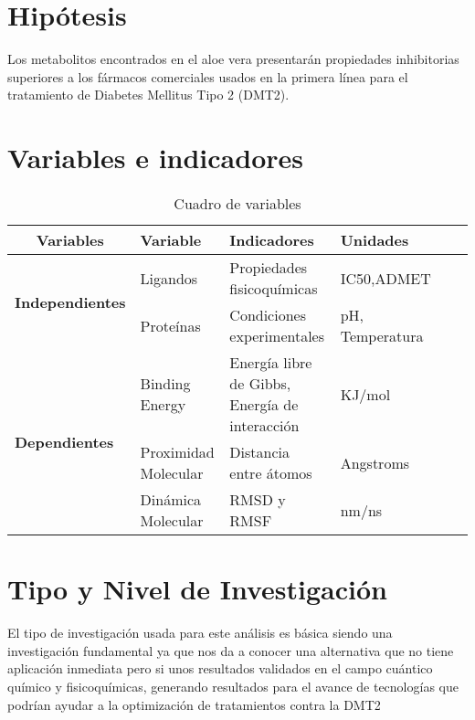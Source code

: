 \section{Hipótesis}
Los metabolitos encontrados en el aloe vera presentarán propiedades inhibitorias superiores a los fármacos comerciales usados en la primera línea para el tratamiento de Diabetes Mellitus Tipo 2 (DMT2).  


\section{Variables e indicadores}

 \begin{table}[htbp]
 \caption{Cuadro de variables}\label{t1}
  \begin{tabular}{llcp{3.5cm}p{3.5cm}p{3.5cm}cp{3.5cm}}
  \hline
  \multicolumn{3}{c}{\textbf{Variables}}                       & \textbf{Variable}      & \textbf{Indicadores}                 & \textbf{Unidades} \\ \hline
  \multicolumn{3}{c}{\multirow{2}{*}{\textbf{Independientes}}} 
  & Ligandos & Propiedades fisicoquímicas & IC50,ADMET\\ \cline{4-6} 
  \multicolumn{3}{c}{}                                         &Proteínas  & Condiciones experimentales  & pH, Temperatura \\ \hline
  \multicolumn{3}{l}{\multirow{3}{*}{\textbf{Dependientes}}}   &Binding Energy   &Energía libre de Gibbs, Energía de interacción   & KJ/mol \\ \cline{4-6} 
  \multicolumn{3}{l}{}                                         &Proximidad Molecular   &Distancia entre átomos   &Angstroms \\ \cline{4-6} 
  \multicolumn{3}{l}{}                                         &Dinámica Molecular   &RMSD y RMSF   &nm/ns \\ \hline 
  \end{tabular}
\end{table}

\section{Tipo y Nivel de Investigación}
El tipo de investigación usada para este análisis es básica siendo una investigación fundamental ya que nos da a conocer una alternativa que no tiene aplicación inmediata pero si unos resultados validados en el campo cuántico químico y fisicoquímicas, generando resultados para el avance de tecnologías que podrían ayudar a la optimización de tratamientos contra la DMT2  


